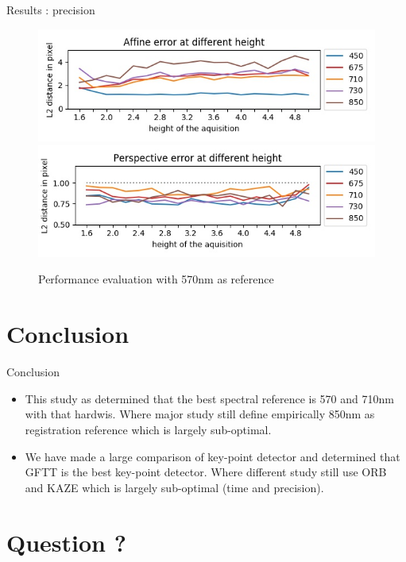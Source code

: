 \documentclass{beamer}
\begin{document}
		\begin{frame}{Results : precision}
			\begin{figure}
				\includegraphics[width=0.8\linewidth]{../figures/affine-allignement-rmse.jpg} \\
				\includegraphics[width=0.8\linewidth]{../figures/prespective-allignement-rmse.jpg}
				\caption{Performance evaluation with 570nm as reference}
			\end{figure}
		\end{frame}
	
	\section{Conclusion}
	
		\begin{frame}{Conclusion}
			\begin{itemize}
				\item This study as determined that the best spectral reference is 570 and 710nm with that hardwis.
				Where major study still define empirically 850nm as registration reference which is largely sub-optimal.
				\item We have made a large comparison of key-point detector and determined that GFTT is the best key-point detector.
				Where different study still use ORB and KAZE which is largely sub-optimal (time and precision).
			\end{itemize}
		\end{frame}
	
	\section{Question ?}
			
\end{document}
